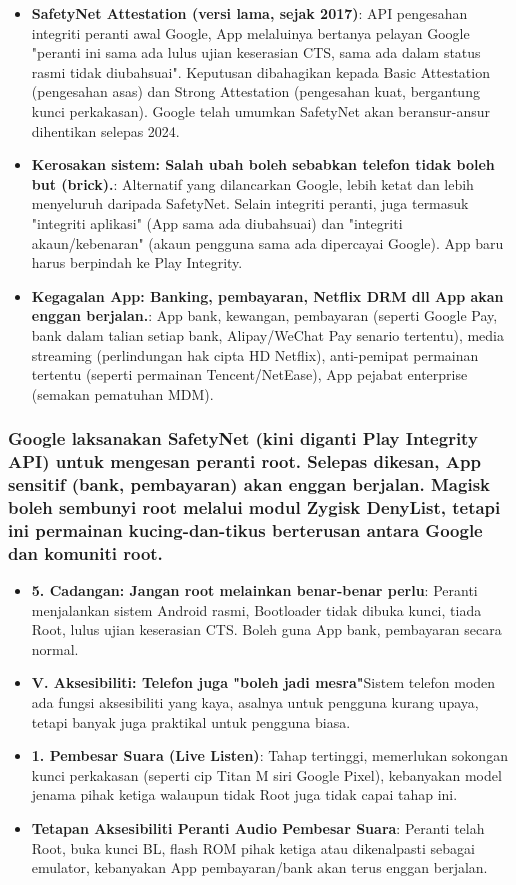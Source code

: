 \begin{itemize}
  \item \textbf{SafetyNet Attestation (versi lama, sejak 2017)}: API pengesahan integriti peranti awal Google, App melaluinya bertanya pelayan Google "peranti ini sama ada lulus ujian keserasian CTS, sama ada dalam status rasmi tidak diubahsuai". Keputusan dibahagikan kepada Basic Attestation (pengesahan asas) dan Strong Attestation (pengesahan kuat, bergantung kunci perkakasan). Google telah umumkan SafetyNet akan beransur-ansur dihentikan selepas 2024.
  \item \textbf{Kerosakan sistem: Salah ubah boleh sebabkan telefon tidak boleh but (brick).}: Alternatif yang dilancarkan Google, lebih ketat dan lebih menyeluruh daripada SafetyNet. Selain integriti peranti, juga termasuk "integriti aplikasi" (App sama ada diubahsuai) dan "integriti akaun/kebenaran" (akaun pengguna sama ada dipercayai Google). App baru harus berpindah ke Play Integrity.
  \item \textbf{Kegagalan App: Banking, pembayaran, Netflix DRM dll App akan enggan berjalan.}: App bank, kewangan, pembayaran (seperti Google Pay, bank dalam talian setiap bank, Alipay/WeChat Pay senario tertentu), media streaming (perlindungan hak cipta HD Netflix), anti-pemipat permainan tertentu (seperti permainan Tencent/NetEase), App pejabat enterprise (semakan pematuhan MDM).
\end{itemize}

\subsubsection*{Google laksanakan SafetyNet (kini diganti Play Integrity API) untuk mengesan peranti root. Selepas dikesan, App sensitif (bank, pembayaran) akan enggan berjalan. Magisk boleh sembunyi root melalui modul Zygisk DenyList, tetapi ini permainan kucing-dan-tikus berterusan antara Google dan komuniti root.}

\begin{itemize}
  \item \textbf{5. Cadangan: Jangan root melainkan benar-benar perlu}: Peranti menjalankan sistem Android rasmi, Bootloader tidak dibuka kunci, tiada Root, lulus ujian keserasian CTS. Boleh guna App bank, pembayaran secara normal.
  \item \textbf{V. Aksesibiliti: Telefon juga "boleh jadi mesra"}Sistem telefon moden ada fungsi aksesibiliti yang kaya, asalnya untuk pengguna kurang upaya, tetapi banyak juga praktikal untuk pengguna biasa.
  \item \textbf{1. Pembesar Suara (Live Listen)}: Tahap tertinggi, memerlukan sokongan kunci perkakasan (seperti cip Titan M siri Google Pixel), kebanyakan model jenama pihak ketiga walaupun tidak Root juga tidak capai tahap ini.
  \item \textbf{Tetapan Aksesibiliti Peranti Audio Pembesar Suara}: Peranti telah Root, buka kunci BL, flash ROM pihak ketiga atau dikenalpasti sebagai emulator, kebanyakan App pembayaran/bank akan terus enggan berjalan.
\end{itemize}


